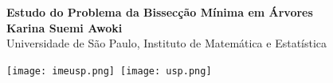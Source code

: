 \documentclass[a0,portrait]{a0poster}
\begin{document}


\begin{minipage}[b]{0.75\linewidth}
\VeryHuge \center \color{NavyBlue} \textbf{Estudo do Problema da Bissecção Mínima em Árvores} \color{Black}\\ %
[2cm]
\huge \textbf{Karina Suemi Awoki}\\[0.6cm] %
\huge Universidade de São Paulo, Instituto de Matemática e Estatística\\[0.6cm] %
\end{minipage}
%
\begin{minipage}[b]{0.25\linewidth}
\texttt{[image: imeusp.png]}\
\texttt{[image: usp.png]}\\
\end{minipage}

\vspace{3cm} %

\end{document}
